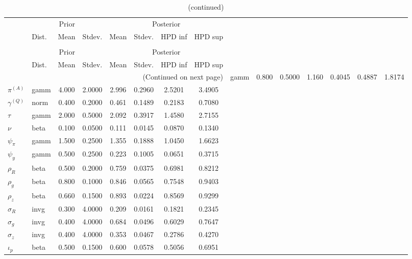  
\begin{center}
\begin{longtable}{llcccccc} 
\caption{Results from Metropolis-Hastings (parameters)}
 \label{Table:MHPosterior:1}\\
\toprule 
  & \multicolumn{3}{c}{Prior}  &  \multicolumn{4}{c}{Posterior} \\
  \cmidrule(r{.75em}){2-4} \cmidrule(r{.75em}){5-8}
  & Dist. & Mean  & Stdev. & Mean & Stdev. & HPD inf & HPD sup\\
\midrule \endfirsthead 
\caption{(continued)}\\\toprule 
  & \multicolumn{3}{c}{Prior}  &  \multicolumn{4}{c}{Posterior} \\
  \cmidrule(r{.75em}){2-4} \cmidrule(r{.75em}){5-8}
  & Dist. & Mean  & Stdev. & Mean & Stdev. & HPD inf & HPD sup\\
\midrule \endhead 
\bottomrule \multicolumn{8}{r}{(Continued on next page)} \endfoot 
\bottomrule \endlastfoot 
${r_{A}}$ & gamm &   0.800 & 0.5000 &   1.160& 0.4045 &  0.4887 &  1.8174 \\ 
${\pi^{(A)}}$ & gamm &   4.000 & 2.0000 &   2.996& 0.2960 &  2.5201 &  3.4905 \\ 
${\gamma^{(Q)}}$ & norm &   0.400 & 0.2000 &   0.461& 0.1489 &  0.2183 &  0.7080 \\ 
${\tau}$ & gamm &   2.000 & 0.5000 &   2.092& 0.3917 &  1.4580 &  2.7155 \\ 
${\nu}$ & beta &   0.100 & 0.0500 &   0.111& 0.0145 &  0.0870 &  0.1340 \\ 
${\psi_\pi}$ & gamm &   1.500 & 0.2500 &   1.355& 0.1888 &  1.0450 &  1.6623 \\ 
${\psi_y}$ & gamm &   0.500 & 0.2500 &   0.223& 0.1005 &  0.0651 &  0.3715 \\ 
${\rho_R}$ & beta &   0.500 & 0.2000 &   0.759& 0.0375 &  0.6981 &  0.8212 \\ 
${\rho_{g}}$ & beta &   0.800 & 0.1000 &   0.846& 0.0565 &  0.7548 &  0.9403 \\ 
${\rho_z}$ & beta &   0.660 & 0.1500 &   0.893& 0.0224 &  0.8569 &  0.9299 \\ 
${\sigma_R}$ & invg &   0.300 & 4.0000 &   0.209& 0.0161 &  0.1821 &  0.2345 \\ 
${\sigma_{g}}$ & invg &   0.400 & 4.0000 &   0.684& 0.0496 &  0.6029 &  0.7647 \\ 
${\sigma_z}$ & invg &   0.400 & 4.0000 &   0.353& 0.0467 &  0.2786 &  0.4270 \\ 
${\iota_p}$ & beta &   0.500 & 0.1500 &   0.600& 0.0578 &  0.5056 &  0.6951 \\ 
\end{longtable}
 \end{center}
